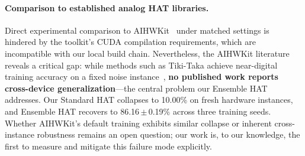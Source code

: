 \paragraph{Comparison to established analog HAT libraries.}
Direct experimental comparison to AIHWKit~\citep{rasch2021aihwkit} under matched settings is hindered by the toolkit's CUDA compilation requirements, which are incompatible with our local build chain. Nevertheless, the AIHWKit literature reveals a critical gap: while methods such as Tiki-Taka achieve near-digital training accuracy on a fixed noise instance~\citep{fahrenthaler2025analog}, \textbf{no published work reports cross-device generalization}---the central problem our Ensemble HAT addresses. Our Standard HAT collapses to 10.00\% on fresh hardware instances, and Ensemble HAT recovers to 86.16\,$\pm$\,0.19\% across three training seeds. Whether AIHWKit's default training exhibits similar collapse or inherent cross-instance robustness remains an open question; our work is, to our knowledge, the first to measure and mitigate this failure mode explicitly.
